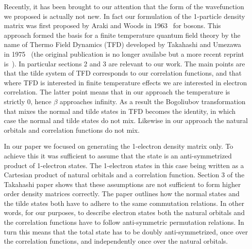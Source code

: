\documentclass[pra]{revtex4-1}
\begin{document}
Recently, it has been brought to our attention that the form of the wavefunction
we proposed is actually not new. In fact our formulation of the 1-particle 
density matrix was first proposed by Araki and Woods in 1963~\cite{Araki_1963}
for bosons. This approach formed the basis for a finite temperature
quantum field theory by the name of Thermo Field Dynamics (TFD) developed by
Takahashi and Umezawa in 1975~\cite{TAKAHASHI_1975} (the original publication
is no longer availabe but a more recent reprint is~\cite{TAKAHASHI_1996}).
In particular sections 2 and 3 are relevant to our work. The main points are that
the tilde system of TFD corresponds to our correlation functions, and that where TFD
is interested in finite temperature effects we are interested in electron correlation.
The latter point means that in our approach the temperature is strictly 0, hence
$\beta$ approaches infinity. As a result the Bogoliubov transformation that mixes the normal
and tilde states in TFD becomes the identity, in which case the normal and tilde states 
do not mix. Likewise in our approach the natural orbitals and correlation functions
do not mix. 

In our paper we focused on generating the 1-electron density matrix only. To achieve this
it was sufficient to assume that the state is an anti-symmetrized product of 1-electron 
states. The 1-electron states in this case being written as a Cartesian product of natural orbitals
and a correlation function. Section 3 of the Takahashi paper shows that these assumptions
are not sufficient to form higher order density matrices correctly. The paper outlines how
the normal states and the tilde states both have to adhere to the same commutation relations.
In other words, for our purposes, to describe electron states both the natural
orbitals and the correlation functions have to follow anti-symmetric permutation relations.
In turn this means that the total state has to be doubly anti-symmetrized, once over the 
correlation functions, and independently once over the natural orbitals. 





\end{document}
